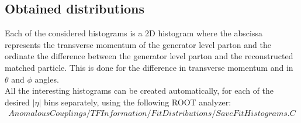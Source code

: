 \subsection{Obtained distributions}\label{subsec::FitRanges}
Each of the considered histograms is a 2D histogram where the abscissa represents the transverse momentum of the generator level parton and the ordinate the difference between the generator level parton and the reconstructed matched particle. This is done for the difference in transverse momentum and in $\theta$ and $\phi$ angles.\\
All the interesting histograms can be created automatically, for each of the desired $\vert \eta \vert$ bins separately, using the following ROOT analyzer:
\begin{eqnarray*}
 AnomalousCouplings/TFInformation/FitDistributions/SaveFitHistograms.C
\end{eqnarray*}

